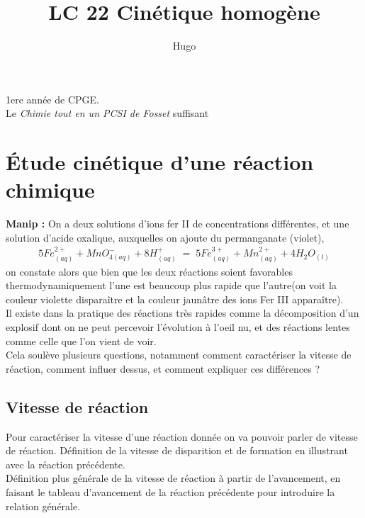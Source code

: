 \documentclass[12pt,prb,aps,epsf]{article}
\begin{document}
	
	\title{LC 22 Cinétique homogène}
	\author{Hugo}
	
	\maketitle
	
	\tableofcontents
	
	\pagebreak
	
	
1ere année de CPGE.\\

Le \textit{Chimie tout en un PCSI de Fosset} suffisant	
\section{Étude cinétique d'une réaction chimique}
	\textbf{Manip :} On a deux solutions d'ions fer II de concentrations différentes, et une solution d'acide oxalique, auxquelles on ajoute du permanganate (violet),
\begin{eqnarray}
5Fe^{2+}_{(aq)} + MnO^{-}_{4(aq)} + 8H^+_{(aq)} \;=\; 5Fe^{3+}_{(aq)} + Mn^{2+}_{(aq)} + 4H_2O_{(l)}
\end{eqnarray}	
	 on constate alors que bien que les deux réactions soient favorables thermodynamiquement l'une est beaucoup plus rapide que l'autre(on voit la couleur violette disparaître et la couleur jaunâtre des ions Fer III apparaître).\\

Il existe dans la pratique des réactions très rapides comme la décomposition d'un explosif dont on ne peut percevoir l'évolution à l'oeil nu, et des réactions lentes comme celle que l'on vient de voir.\\

 Cela soulève plusieurs questions, notamment comment caractériser la vitesse de réaction, comment influer dessus, et comment expliquer ces différences ?

\subsection{Vitesse de réaction}
Pour caractériser la vitesse d'une réaction donnée on va pouvoir parler de vitesse de réaction.
Définition de la vitesse de disparition et de formation en illustrant avec la réaction précédente.\\
Définition plus générale de la vitesse de réaction à partir de l'avancement, en faisant le tableau d'avancement de la réaction précédente pour introduire la relation générale.\\
\end{document}
